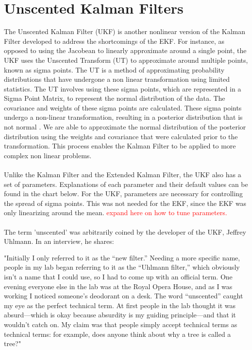 \chapter{Unscented Kalman Filters}
\label{Unscented Kalman Filters}

The Unscented Kalman Filter (UKF) is another nonlinear version of the Kalman Filter developed to address the shortcomings of the EKF. For instance, as opposed to using the Jacobean to linearly approximate around a single point, the UKF uses the Unscented Transform (UT) to approximate around multiple points, known as sigma points. The UT is a method of approximating probability distributions that have undergone a non linear transformation using limited statistics. The UT involves using these sigma points, which are represented in a Sigma Point Matrix, to represent the normal distribution of the data. The covariance and weights of these sigma points are calculated. These sigma points undergo a non-linear transformation, resulting in a posterior distribution that is not normal \cite{inbook, Wan01theunscented} . We are able to approximate the normal distribution of the posterior distribution using the weights and covariance that were calculated prior to the transformation. This process enables the Kalman Filter to be applied to more complex non linear problems. \\ \\
Unlike the Kalman Filter and the Extended Kalman Filter, the UKF also has a set of parameters. Explanations of each parameter and their default values can be found in the chart below. For the UKF, parameters are necessary for controlling the spread of sigma points. This was not needed for the EKF, since the EKF was only linearizing around the mean.
\textcolor{red}{expand here on how to tune parameters.} \\ \\
The term 'unscented' was arbitrarily coined by the developer of the UKF, Jeffrey Uhlmann. In an interview, he shares:
\begin{displayquote}
"Initially I only referred to it as the “new filter.” Needing a more specific name, people in my lab began referring to it as the “Uhlmann filter,” which obviously isn’t a name that I could use, so I had to come up with an official term. One evening everyone else in the lab was at the Royal Opera House, and as I was working I noticed someone’s deodorant on a desk. The word “unscented” caught my eye as the perfect technical term. At first people in the lab thought it was absurd—which is okay because absurdity is my guiding principle—and that it wouldn’t catch on. My claim was that people simply accept technical terms as technical terms: for example, does anyone think about why a tree is called a tree?"
\end{displayquote}


